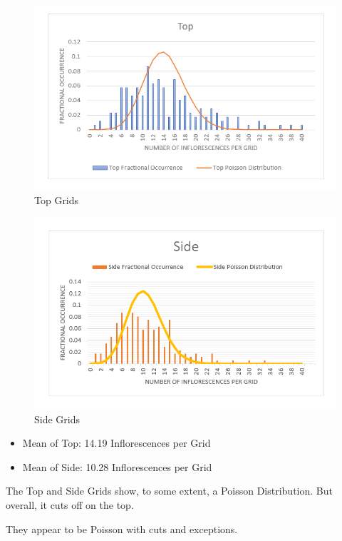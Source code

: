\documentclass[twocolumn]{article}
\begin{document}
\begin{figure}[h]
\includegraphics[width = \linewidth]{Top Poisson.png}
\caption{Top Grids}
\end{figure}

\begin{figure}[h]
\includegraphics[width = \linewidth]{Side Poisson.png}
\caption{Side Grids}
\end{figure}


\begin{itemize}
    \item Mean of Top: 14.19 Inflorescences per Grid
    \item Mean of Side: 10.28 Inflorescences per Grid
\end{itemize}

The Top and Side Grids show, to some extent, a Poisson Distribution. But overall, it cuts off on the top. 

They appear to be Poisson with cuts and exceptions.
\end{document}

